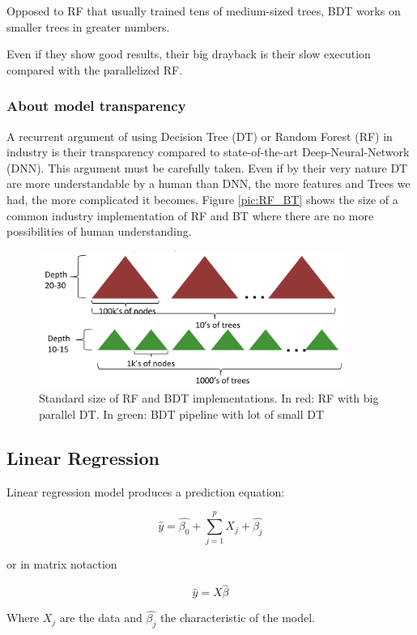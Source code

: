 Opposed to RF that usually trained tens of medium-sized trees, BDT works on smaller trees in greater numbers.

Even if they show good results, their big drayback is their slow execution compared with the parallelized RF.


\subsubsection{About model transparency}

A recurrent argument of using Decision Tree (DT) or Random Forest (RF) in industry is their transparency compared to state-of-the-art Deep-Neural-Network (DNN). This argument must be carefully taken. Even if by their very nature DT are more understandable by a human than DNN, the more features and Trees we had, the more complicated it becomes. Figure \ref{pic:RF_BT} shows the size of a common industry implementation of RF and BT where there are no more possibilities of human understanding.

\begin{figure}[H]%
 \centering
 \includegraphics[width=10cm]{./img/07/RF_BT.png}
 \caption{\label{pic:RF_BT.} Standard size of RF and BDT implementations.
 In red: RF with big parallel DT. In green: BDT pipeline with lot of small DT}
\end{figure}


\subsection{Linear Regression}

Linear regression model produces a prediction equation:

$$
\hat{y} = \hat{\beta_0} + \sum\limits_{j=1}^p  X_j + \hat{ \beta_j}
$$

or in matrix notaction

$$
\hat{y} =X \hat{ \beta}
$$

Where $X_j$ are the data and $\hat{\beta_j}$ the characteristic of the model. 

